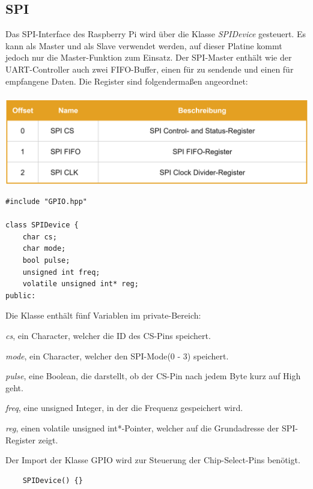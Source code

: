 \documentclass[12pt]{article}
\begin{document}
\subsection{SPI}
Das SPI-Interface des Raspberry Pi wird über die Klasse \textit{SPIDevice} gesteuert. Es kann als Master und als Slave verwendet werden, auf dieser Platine kommt jedoch nur die Master-Funktion zum Einsatz. Der SPI-Master enthält wie der UART-Controller auch zwei FIFO-Buffer, einen für zu sendende und einen für empfangene Daten. Die Register sind folgendermaßen angeordnet:\\\\
\includegraphics[width=\textwidth]{img/spi_table.PNG}
\begin{center}\end{center}
\newpage
\begin{verbatim}
#include "GPIO.hpp"

class SPIDevice {
    char cs;
    char mode;
    bool pulse;
    unsigned int freq;
    volatile unsigned int* reg;
public:
\end{verbatim}
\vspace{-2mm}
Die Klasse enthält fünf Variablen im private-Bereich:
\begin{compactitem}
\item \textit{cs}, ein Character, welcher die ID des CS-Pins speichert.
\item \textit{mode}, ein Character, welcher den SPI-Mode(0 - 3) speichert.
\item \textit{pulse}, eine Boolean, die darstellt, ob der CS-Pin nach jedem Byte kurz auf High geht.
\item \textit{freq}, eine unsigned Integer, in der die Frequenz gespeichert wird.
\item \textit{reg}, einen volatile unsigned int*-Pointer, welcher auf die Grundadresse der SPI-Register zeigt.
\end{compactitem} Der Import der Klasse GPIO wird zur Steuerung der Chip-Select-Pins benötigt.\\
\begin{verbatim}
    SPIDevice() {}
\end{verbatim}
\end{document}
